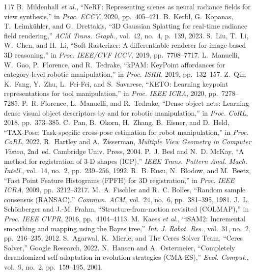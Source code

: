 \documentclass[10pt,journal]{IEEEtran}
\begin{document}
{\begin{thebibliography}{117}
 B.~Mildenhall \emph{et al.}, ``NeRF: Representing scenes as neural radiance fields for view synthesis,'' in \emph{Proc. ECCV}, 2020, pp.~405--421.
 B.~Kerbl, G.~Kopanas, T.~Leimk\"uhler, and G.~Drettakis, ``3D Gaussian Splatting for real-time radiance field rendering,'' \emph{ACM Trans. Graph.}, vol.~42, no.~4, p.~139, 2023.
 S.~Liu, T.~Li, W.~Chen, and H.~Li, ``Soft Rasterizer: A differentiable renderer for image-based 3D reasoning,'' in \emph{Proc. IEEE/CVF ICCV}, 2019, pp.~7708--7717.
 L.~Manuelli, W.~Gao, P.~Florence, and R.~Tedrake, ``kPAM: KeyPoint affordances for category-level robotic manipulation,'' in \emph{Proc. ISRR}, 2019, pp.~132--157.
 Z.~Qin, K.~Fang, Y.~Zhu, L.~Fei-Fei, and S.~Savarese, ``KETO: Learning keypoint representations for tool manipulation,'' in \emph{Proc. IEEE ICRA}, 2020, pp.~7278--7285.
 P.~R. Florence, L.~Manuelli, and R.~Tedrake, ``Dense object nets: Learning dense visual object descriptors by and for robotic manipulation,'' in \emph{Proc. CoRL}, 2018, pp.~373--385.
 C.~Pan, B.~Okorn, H.~Zhang, B.~Eisner, and D.~Held, ``TAX-Pose: Task-specific cross-pose estimation for robot manipulation,'' in \emph{Proc. CoRL}, 2022.
 R.~Hartley and A.~Zisserman, \emph{Multiple View Geometry in Computer Vision}, 2nd~ed. Cambridge Univ. Press, 2004.
 P.~J. Besl and N.~D. McKay, ``A method for registration of 3-D shapes (ICP),'' \emph{IEEE Trans. Pattern Anal. Mach. Intell.}, vol.~14, no.~2, pp.~239--256, 1992.
 R.~B. Rusu, N.~Blodow, and M.~Beetz, ``Fast Point Feature Histograms (FPFH) for 3D registration,'' in \emph{Proc. IEEE ICRA}, 2009, pp.~3212--3217.
 M.~A. Fischler and R.~C. Bolles, ``Random sample consensus (RANSAC),'' \emph{Commun. ACM}, vol.~24, no.~6, pp.~381--395, 1981.
 J.~L. Sch\"onberger and J.-M. Frahm, ``Structure-from-motion revisited (COLMAP),'' in \emph{Proc. IEEE CVPR}, 2016, pp.~4104--4113.
 M.~Kaess \emph{et al.}, ``iSAM2: Incremental smoothing and mapping using the Bayes tree,'' \emph{Int. J. Robot. Res.}, vol.~31, no.~2, pp.~216--235, 2012.
 S.~Agarwal, K.~Mierle, and The Ceres Solver Team, ``Ceres Solver,'' Google Research, 2022.
 N.~Hansen and A.~Ostermeier, ``Completely derandomized self-adaptation in evolution strategies (CMA-ES),'' \emph{Evol. Comput.}, vol.~9, no.~2, pp.~159--195, 2001.

\end{thebibliography}}
\end{document}
